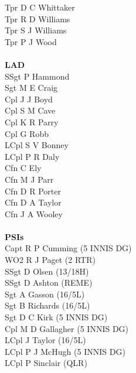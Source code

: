 \begin{multicols}{2}
  Tpr D C Whittaker \\
  Tpr R D Williams \\
  Tpr S J Williams \\
  Tpr P J Wood \\
  \\
  \textbf{LAD} \\
  SSgt P Hammond \\
  Sgt M E Craig \\
  Cpl J J Boyd \\
  Cpl S M Cave \\
  Cpl K R Parry \\
  Cpl G Robb \\
  LCpl S V Bonney \\
  LCpl P R Daly \\
  Cfn C Ely \\
  Cfn M J Parr \\
  Cfn D R Porter \\
  Cfn D A Taylor \\
  Cfn J A Wooley \\
  \\
  \textbf{PSIs} \\
  Capt R P Cumming (5 INNIS DG) \\
  WO2 R J Paget (2 RTR) \\
  SSgt D Olsen (13/18H) \\
  SSgt D Ashton (REME) \\
  Sgt A Gasson (16/5L) \\
  Sgt B Richards (16/5L) \\
  Sgt D C Kirk (5 INNIS DG) \\
  Cpl M D Gallagher (5 INNIS DG) \\
  LCpl J Taylor (16/5L) \\
  LCpl P J McHugh (5 INNIS DG) \\
  LCpl P Sinclair (QLR) \\
\end{multicols}

